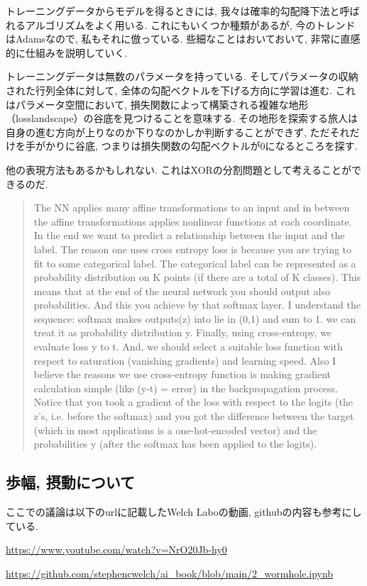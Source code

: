\documentclass{ltjsarticle}      %
\begin{document}
トレーニングデータからモデルを得るときには, 我々は確率的勾配降下法と呼ばれるアルゴリズムをよく用いる.
これにもいくつか種類があるが, 今のトレンドはAdamsなので, 私もそれに倣っている.
些細なことはおいておいて, 非常に直感的に仕組みを説明していく.\par
トレーニングデータは無数のパラメータを持っている.
そしてパラメータの収納された行列全体に対して, 全体の勾配ベクトルを下げる方向に学習は進む.
これはパラメータ空間において, 損失関数によって構築される複雑な地形（losslandscape）の谷底を見つけることを意味する.
その地形を探索する旅人は自身の進む方向が上りなのか下りなのかしか判断することができず, ただそれだけを手がかりに谷底, つまりは損失関数の勾配ベクトルが0になるところを探す.\par
他の表現方法もあるかもしれない.
これはXORの分割問題として考えることができるのだ.
\begin{quote}
The NN applies many affine transformations to an input and in between the affine transformations applies nonlinear functions at each coordinate.
In the end we want to predict a relationship between the input and the label.
The reason one uses cross entropy loss is because you are trying to fit to some categorical label.
The categorical label can be represented as a probability distribution on K points (if there are a total of K classes).
This means that at the end of the neural network you should output also probabilities.
And this you achieve by that softmax layer.
I understand the sequence: softmax makes outputs(z) into lie in (0,1) and sum to 1.
we can treat it as probability distribution y. Finally, using cross-entropy, we evaluate loss y to t.
And, we should select a suitable loss function with respect to saturation (vanishing gradients) and learning speed.
Also I believe the reasons we use cross-entropy function is making gradient calculation simple (like (y-t) = error) in the backpropagation process.
Notice that you took a gradient of the loss with respect to the logits (the z’s, i.e. before the softmax) and you got the difference between the target (which in most applications is a one-hot-encoded vector) and the probabilities y (after the softmax has been applied to the logits).
\end{quote}

\subsection{歩幅, 摂動について}
ここでの議論は以下のurlに記載したWelch Laboの動画, githubの内容も参考にしている.\par
\url{https://www.youtube.com/watch?v=NrO20Jb-hy0}\par
\url{https://github.com/stephencwelch/ai_book/blob/main/2_wormhole.ipynb}
\end{document}
